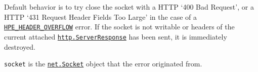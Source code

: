 Default behavior is to try close the socket with a HTTP `400 Bad
Request', or a HTTP `431 Request Header Fields Too Large' in the case of
a \href{errors.md\#hpe_header_overflow}{\texttt{HPE\_HEADER\_OVERFLOW}}
error. If the socket is not writable or headers of the current attached
\hyperref[class-httpserverresponse]{\texttt{http.ServerResponse}} has
been sent, it is immediately destroyed.

\texttt{socket} is the
\href{net.md\#class-netsocket}{\texttt{net.Socket}} object that the
error originated from.

\begin{Shaded}
\begin{Highlighting}[]
 \OperatorTok{;}

\OperatorTok{=}\OperatorTok{,}\KeywordTok{=\textgreater{}}\NormalTok{ \{}
\NormalTok{()}\OperatorTok{;}
\NormalTok{\})}\OperatorTok{;}
\NormalTok{(}\OperatorTok{,}\OperatorTok{,}\KeywordTok{=\textgreater{}}\NormalTok{ \{}
\NormalTok{(}\StringTok{\textquotesingle{}}\NormalTok{)}\OperatorTok{;}
\NormalTok{\})}\OperatorTok{;}
\NormalTok{(}\NormalTok{)}\OperatorTok{;}
\end{Highlighting}
\end{Shaded}

